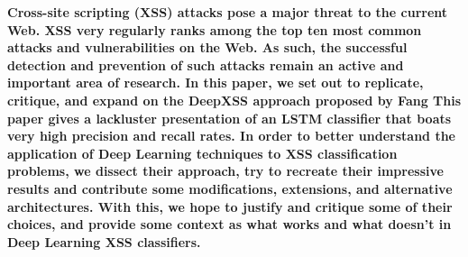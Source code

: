 \textbf{Cross-site scripting (XSS) attacks pose a major threat to the current Web. XSS very regularly ranks among the top ten most common attacks and vulnerabilities on the Web. As such, the successful detection and prevention of such attacks remain an active and important area of research. In this paper, we set out to replicate, critique, and expand on the DeepXSS approach proposed by Fang  This paper gives a lackluster presentation of an LSTM classifier that boats very high precision and recall rates. In order to better understand the application of Deep Learning techniques to XSS classification problems, we dissect their approach, try to recreate their impressive results and contribute some modifications, extensions, and alternative architectures. With this, we hope to justify and critique some of their choices, and provide some context as what works and what doesn't in Deep Learning XSS classifiers.}
